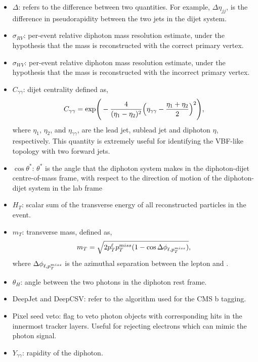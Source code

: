 \begin{itemize}
    \item $\Delta$: refers to the difference between two quantities. For example, $\Delta\eta_{jj}$, is the difference in pseudorapidity between the two jets in the dijet system.
    \item $\sigma_{RV}$: per-event relative diphoton mass resolution estimate, under the hypothesis that the mass is reconstructed with the correct primary vertex. 
    \item $\sigma_{WV}$: per-event relative diphoton mass resolution estimate, under the hypothesis that the mass is reconstructed with the incorrect primary vertex.
    \item $C_{\gamma\gamma}$: dijet centrality defined as,
    \begin{equation}
        C_{\gamma\gamma} = {\rm{exp}} \Bigg( - \frac{4}{(\eta_1-\eta_2)^2} \Big( \eta_{\gamma\gamma} - \frac{\eta_1+\eta_2}{2} \Big)^2 \Bigg),
    \end{equation}
    \noindent
    where $\eta_1$, $\eta_2$, and $\eta_{\gamma\gamma}$, are the lead jet, sublead jet and diphoton $\eta$, respectively. This quantity is extremely useful for identifying the VBF-like topology with two forward jets.
    \item $\cos{\theta^*}$: $\theta^*$ is the angle that the diphoton system makes in the diphoton-dijet centre-of-mass frame, with respect to the direction of motion of the diphoton-dijet system in the lab frame
    \item $H_T$: scalar sum of the transverse energy of all reconstructed particles in the event.
    \item $m_T$: transverse mass, defined as,
    \begin{equation}
        m_T = \sqrt{2p_T^\ell p^{miss}_{T}(1-\cos{\Delta\phi_{\ell,\ensuremath{p^{miss}_{T}}}})},
    \end{equation}
    \noindent
    where $\Delta\phi_{\ell,p^{miss}_{T}}$ is the azimuthal separation between the lepton and \met.
    \item $\theta_H$: angle between the two photons in the diphoton rest frame.
    \item DeepJet and DeepCSV: refer to the algorithm used for the CMS b tagging.
    \item Pixel seed veto: flag to veto photon objects with corresponding hits in the innermost tracker layers. Useful for rejecting electrons which can mimic the photon signal.
    \item $Y_{\gamma\gamma}$: rapidity of the diphoton.

\end{itemize}
